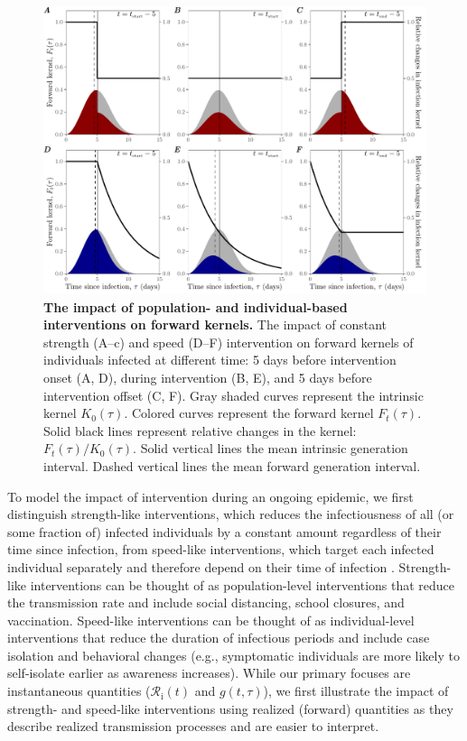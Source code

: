 \documentclass[12pt]{article}
\newcommand{\Rx}[1]{\ensuremath{{\mathcal R}_{#1}}\xspace}
\newcommand{\Ri}{\Rx{\mathrm{i}}}
\begin{document}
\begin{figure}[!th]
\includegraphics[width=1\textwidth]{pop_ind_compare.pdf}
\caption{
\textbf{The impact of population- and individual-based interventions on forward kernels.}
The impact of constant strength (A--c) and speed (D--F) intervention on forward kernels of individuals infected at different time:
5 days before intervention onset (A, D), during intervention (B, E), and 5 days before intervention offset (C, F).
Gray shaded curves represent the intrinsic kernel $K_0(\tau)$.
Colored curves represent the forward kernel $F_t(\tau)$.
Solid black lines represent relative changes in the kernel: $F_t(\tau)/K_0(\tau)$.
Solid vertical lines the mean intrinsic generation interval.
Dashed vertical lines the mean forward generation interval.
}
\label{fig:indpop}
\end{figure}

To model the impact of intervention during an ongoing epidemic, we first distinguish strength-like interventions, which reduces the infectiousness of all (or some fraction of) infected individuals by a constant amount regardless of their time since infection, from speed-like interventions, which target each infected individual separately and therefore depend on their time of infection \citep{dushoff2021speed}.
Strength-like interventions can be thought of as population-level interventions that reduce the transmission rate and include social distancing, school closures, and vaccination.
Speed-like interventions can be thought of as individual-level interventions that reduce the duration of infectious periods and include case isolation and behavioral changes (e.g., symptomatic individuals are more likely to self-isolate earlier as awareness increases).
While our primary focuses are instantaneous quantities ($\Ri(t)$ and $g(t, \tau)$), we first illustrate the impact of strength- and speed-like interventions using realized (forward) quantities as they describe realized transmission processes and are easier to interpret.
\end{document}
